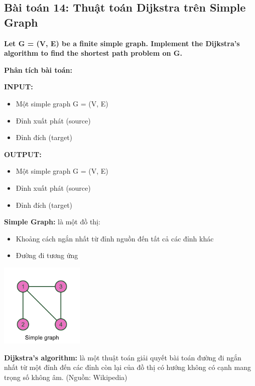 \documentclass[12pt,a4paper]{article}
\begin{document}
\subsection{Bài toán 14: Thuật toán Dijkstra trên Simple Graph}

\begin{problembox}
    \textbf{Let G = (V, E) be a finite simple graph. Implement the Dijkstra's algorithm to find the shortest path problem on G.}
\end{problembox}

\textbf{Phân tích bài toán:}

\textbf{INPUT:}
\begin{itemize}[label=\textbullet]
    \item Một simple graph G = (V, E)
    \item Đỉnh xuất phát (source)
    \item Đỉnh đích (target)
\end{itemize}

\textbf{OUTPUT:}
\begin{itemize}[label=\textbullet]
    \item Một simple graph G = (V, E)
    \item Đỉnh xuất phát (source)
    \item Đỉnh đích (target)
\end{itemize}

\textbf{Simple Graph:} là một đồ thị:
\begin{itemize}[label=\textbullet]
    \item Khoảng cách ngắn nhất từ đỉnh nguồn đến tất cả các đỉnh khác
    \item Đường đi tương ứng
\end{itemize}

{\centering
    \includegraphics[width=0.3\textwidth]{assets/image/simple-graph.png}
\par}
\vspace{1cm}

\textbf{Dijkstra's algorithm:} là một thuật toán giải quyết bài toán đường đi ngắn nhất từ một đỉnh đến các đỉnh còn lại của đồ thị có hướng không có cạnh mang trọng số không âm. (Nguồn: Wikipedia)
\end{document}
